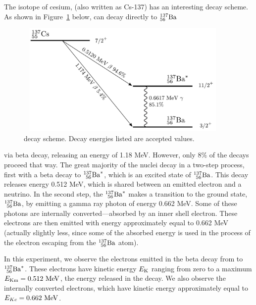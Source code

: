\bigskip

The isotope of cesium,
\cs
(also written as Cs-137) has an interesting decay scheme.  As shown in
Figure~\ref{fig:csdecay} below, \cs can decay directly to
${}^{137}_{56}{\rm Ba}$
\begin{figure}
\begin{centering}
\includegraphics[width=4.1661in,height=2.1661in]{../images/Cs-137-decay.pdf}
\caption{ \cs decay scheme.  Decay energies listed are accepted values. }
\label{fig:csdecay}
\end{centering}
\end{figure}
via beta decay, releasing an energy of 1.18 MeV.  However, only 8\% of the
decays proceed that way.  The great majority of the \cs nuclei decay in a
two-step process, first with a beta decay to ${}^{137}_{\ 56}{\rm Ba}^*$, which is
an excited state of ${}^{137}_{\ 56}{\rm Ba}$.  This decay releases energy 0.512
MeV, which is shared between an emitted electron and a neutrino. In the second
step, the ${}^{137}_{\ 56}{\rm Ba}^*$ makes a transition to the ground state,
${}^{137}_{\ 56}{\rm Ba}$, by emitting a gamma ray photon of energy 0.662 MeV.
Some of these photons are internally converted---absorbed by an inner shell
electron.  These electrons are then emitted with energy approximately equal to
0.662 MeV (actually slightly less, since some of the absorbed energy is used in
the process of the electron escaping from the ${}^{137}_{\ 56}{\rm Ba}$ atom).

In this experiment, we observe the electrons emitted in the beta decay from \cs
to ${}^{137}_{\ 56}{\rm Ba}^*$.  These electrons have kinetic energy $E_{\rm K}$
ranging from zero to a maximum $E_{\rm Km} = 0.512~{\rm MeV}$, the energy
released in the decay.  We also observe the internally converted electrons,
which have kinetic energy approximately equal to $E_{Kc} = 0.662~{\rm MeV}$.  

